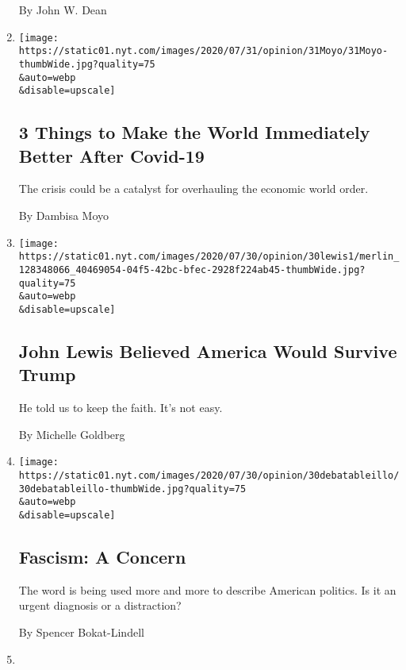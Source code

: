 \begin{enumerate}
  By John W. Dean
\item
  \href{/2020/07/31/opinion/coronavirus-economy.html}{}

  \texttt{[image: https://static01.nyt.com/images/2020/07/31/opinion/31Moyo/31Moyo-thumbWide.jpg?quality=75\\\&auto=webp\\\&disable=upscale]}

  \hypertarget{3-things-to-make-the-world-immediately-better-after-covid-19}{%
  \subsection{3 Things to Make the World Immediately Better After
  Covid-19}\label{3-things-to-make-the-world-immediately-better-after-covid-19}}

  The crisis could be a catalyst for overhauling the economic world
  order.

  By Dambisa Moyo
\item
  \href{/2020/07/30/opinion/john-lewis-legacy.html}{}

  \texttt{[image: https://static01.nyt.com/images/2020/07/30/opinion/30lewis1/merlin\_128348066\_40469054-04f5-42bc-bfec-2928f224ab45-thumbWide.jpg?quality=75\\\&auto=webp\\\&disable=upscale]}

  \hypertarget{john-lewis-believed-america-would-survive-trump}{%
  \subsection{John Lewis Believed America Would Survive
  Trump}\label{john-lewis-believed-america-would-survive-trump}}

  He told us to keep the faith. It's not easy.

  By Michelle Goldberg
\item
  \href{/2020/07/30/opinion/fascism-us.html}{}

  \texttt{[image: https://static01.nyt.com/images/2020/07/30/opinion/30debatableillo/30debatableillo-thumbWide.jpg?quality=75\\\&auto=webp\\\&disable=upscale]}

  \hypertarget{fascism-a-concern}{%
  \subsection{Fascism: A Concern}\label{fascism-a-concern}}

  The word is being used more and more to describe American politics. Is
  it an urgent diagnosis or a distraction?

  By Spencer Bokat-Lindell
\item
  \href{/2020/07/30/opinion/trump-delay-election-coronavirus.html}{}


\end{enumerate}
